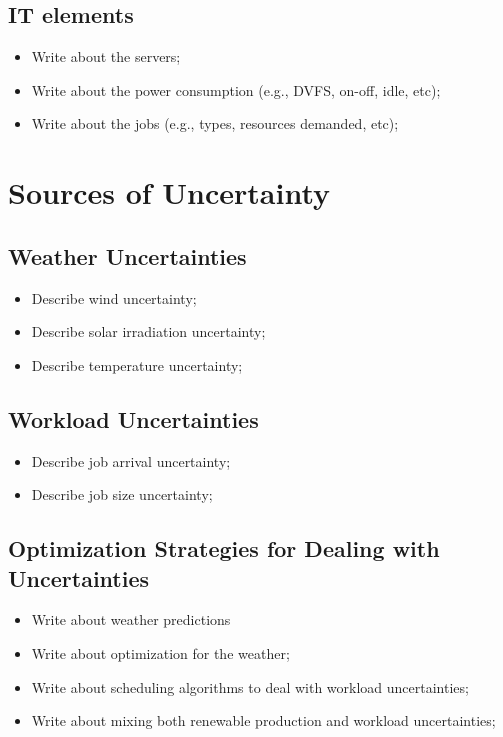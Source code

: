 \subsection{IT elements}
\begin{itemize}
    \item Write about the servers;
    \item Write about the power consumption (e.g., DVFS, on-off, idle, etc);
    \item Write about the jobs (e.g., types, resources demanded, etc);
\end{itemize}

\section{Sources of Uncertainty}

\subsection{Weather Uncertainties}
\begin{itemize}
    \item Describe wind uncertainty;
    \item Describe solar irradiation uncertainty;
    \item Describe temperature uncertainty;
\end{itemize}

\subsection{Workload Uncertainties}
\begin{itemize}
    \item Describe job arrival uncertainty;
    \item Describe job size uncertainty;
\end{itemize}

\subsection{Optimization Strategies for Dealing with Uncertainties}
\begin{itemize}
    \item Write about weather predictions
    \item Write about optimization for the weather;
    \item Write about scheduling algorithms to deal with workload uncertainties;
    \item Write about mixing both renewable production and workload uncertainties;
\end{itemize}

